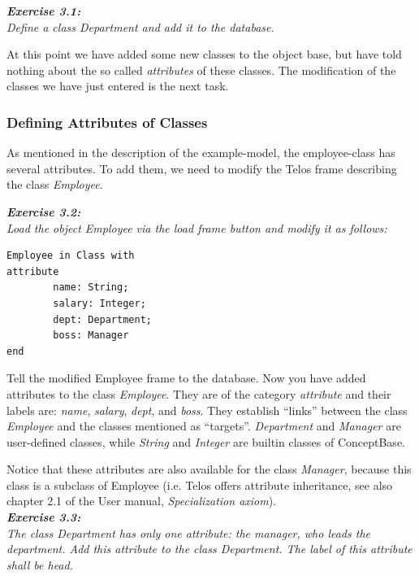 \documentclass[10pt,a4paper]{article}
\begin{document}
\vspace{0.7cm}
{\it
{\bf Exercise 3.1:}\\
Define a class {\em Department} and add it to the database. \\
}

At this point we have added some new classes to the object
base, but have told nothing about the so called {\em attributes} of these
classes.  The modification of the classes we have just entered is the
next task.


\subsubsection{Defining Attributes of Classes}

As mentioned in the description of the example-model, the employee-class
has several attributes. To add them, we need to modify the Telos frame
describing the class {\em Employee}.

\vspace{0.7cm}
{\it
{\bf Exercise 3.2:} \\
Load the object
{\em Employee} via the {\em load frame} button and
modify it as follows:
}

\begin{verbatim}
Employee in Class with
attribute
        name: String;
        salary: Integer;
        dept: Department;
        boss: Manager
end
\end{verbatim}

Tell the modified Employee frame to the database.
Now you have added attributes to the class {\em Employee}.
They are of the category {\em attribute} and  their labels are:
{\em name}, {\em salary}, {\em dept}, and {\em boss}.  They establish ``links''
between the class {\em Employee} and the classes mentioned as ``targets''.
{\em Department} and {\em Manager} are user-defined classes, while {\em String}
and {\em Integer} are builtin classes of ConceptBase. 

Notice that these attributes are also available for the class
{\em Manager}, because this class is a subclass of Employee
(i.e. Telos offers attribute inheritance, see also chapter 2.1
of the User manual, {\em Specialization axiom}).\\

\vspace{0.7cm}
{\it
{\bf Exercise 3.3:}\\
The class Department has only one attribute: the manager,
who leads the department. Add this attribute to the class Department.
The label of this attribute shall be {\em head}.\\
}
\end{document}
